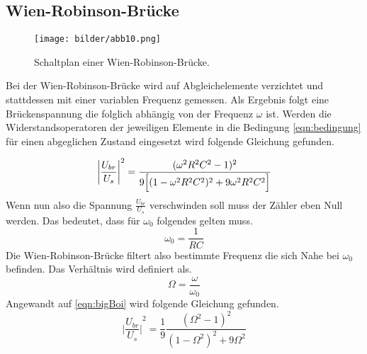 \subsection{Wien-Robinson-Brücke}
\begin{figure}
    \centering
    \texttt{[image: bilder/abb10.png]}
    \caption{Schaltplan einer Wien-Robinson-Brücke. \cite{skript}} 
    \label{fig:abb10}
\end{figure}
\begin{flushleft}
Bei der Wien-Robinson-Brücke wird auf Abgleichelemente verzichtet und stattdessen mit einer variablen Frequenz gemessen.
Als Ergebnis folgt eine Brückenspannung die folglich abhängig von der Frequenz $\omega$ ist.
Werden die Widerstandsoperatoren der jeweiligen Elemente 
in die Bedingung \eqref{eqn:bedingung} für einen abgeglichen Zustand eingesetzt wird folgende Gleichung gefunden.
\end{flushleft}
\begin{equation} %
    \label{eqn:bigBoi}
    {\biggl| \frac{U_{br}}{U_s} \biggr| }^2 = \frac{(\omega ^2 R^2 C^2 -1)^2}{9\Bigl[(1-\omega ^2 R^2 C^2)^2 + 9 \omega ^2 R^2 C^2 \Bigr]}
\end{equation}
Wenn nun also die Spannung $\frac{U_{br}}{U_s}$ verschwinden soll muss der Zähler eben Null werden. Das bedeutet, dass für 
$\omega_0$ folgendes gelten muss.
\begin{equation}
    \label{eqn:ma}
    \omega_0 = \frac{1}{RC}
\end{equation}
Die Wien-Robinson-Brücke filtert also bestimmte Frequenz die sich Nahe bei $\omega_0$ befinden. Das Verhältnis wird definiert als.
\begin{equation}
    \label{eqn:OMEGALULW}
    \Omega = \frac{\omega}{\omega_0}
\end{equation}
Angewandt auf \eqref{eqn:bigBoi} wird folgende Gleichung gefunden.
\begin{equation}
    \label{eqn:ya}
    {\biggl| \frac{U_{br}}{U_s} \biggr| }^2 = \frac{1}{9}\frac{(\Omega^2 -1)^2}{(1-\Omega^2)^2+9\Omega^2}
\end{equation}
\\
\newline
